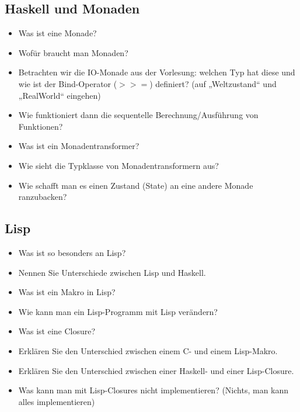 \documentclass[
  a4paper,
  11pt,
]{article}
\newcommand{\gge}{>\!\!>\!\!=}
\begin{document}
\subsection*{Haskell und Monaden}
\label{sub:Haskell und Monaden}

\begin{itemize}
  \item Was ist eine Monade?
  \item Wofür braucht man Monaden?
  \item Betrachten wir die IO-Monade aus der Vorlesung: welchen Typ hat diese
    und wie ist der Bind-Operator ($\gge$) definiert? (auf „Weltzustand“
    und „RealWorld“ eingehen)
  \item Wie funktioniert dann die sequentelle Berechnung/Ausführung von
    Funktionen?
  \item Was ist ein Monadentransformer?
  \item Wie sieht die Typklasse von Monadentransformern aus?
  \item Wie schafft man es einen Zustand (State) an eine andere Monade
    ranzubacken?
\end{itemize}

\subsection*{Lisp}
\label{sub:Lisp}

\begin{itemize}
  \item Was ist so besonders an Lisp?
  \item Nennen Sie Unterschiede zwischen Lisp und Haskell.
  \item Was ist ein Makro in Lisp?
  \item Wie kann man ein Lisp-Programm mit Lisp verändern?
  \item Was ist eine Closure?
  \item Erklären Sie den Unterschied zwischen einem C- und einem Lisp-Makro.
  \item Erklären Sie den Unterschied zwischen einer Haskell- und einer
    Lisp-Closure.
  \item Was kann man mit Lisp-Closures nicht implementieren? (Nichts, man kann alles implementieren)
\end{itemize}
\end{document}
